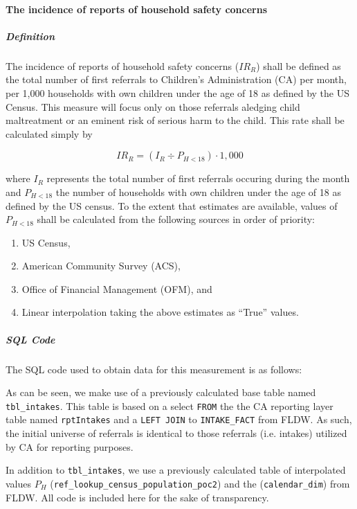 \documentclass[12pt]{article}\usepackage[]{graphicx}\usepackage[]{color}
\begin{document}
\paragraph{The incidence of reports of household safety concerns}

\subparagraph{Definition} The incidence of reports of household safety concerns ($IR_R$) shall be defined as the total number of first referrals to Children's Administration (CA) per month, per 1,000 households with own children under the age of 18 as defined by the US Census. This measure will focus only on those referrals aledging child maltreatment or an eminent risk of serious harm to the child. This rate shall be calculated simply by 

\begin{equation}\label{eq:IRR}
IR_R = (I_R \div P_{H<18}) \cdot 1,000
\end{equation}

where $I_R$ represents the total number of first referrals occuring during the month and $P_{H<18}$ the number of households with own children under the age of 18 as defined by the US census. To the extent that estimates are available, values of $P_{H<18}$ shall be calculated from the following sources in order of priority:

\begin{enumerate}
  \item US Census,
  \item American Community Survey (ACS), 
  \item Office of Financial Management (OFM), and 
  \item Linear interpolation taking the above estimates as ``True'' values. 
\end{enumerate}

\subparagraph{SQL Code}

The SQL code used to obtain data for this measurement is as follows: 



As can be seen, we make use of a previously calculated base table named \texttt{tbl\_intakes}. This table is based on a select \texttt{FROM} the the CA reporting layer table named \texttt{rptIntakes} and a \texttt{LEFT JOIN} to \texttt{INTAKE\_FACT} from FLDW. As such, the initial universe of referrals is identical to those referrals (i.e. intakes) utilized by CA for reporting purposes.  

In addition to \texttt{tbl\_intakes}, we use a previously calculated table of interpolated values $P_H$ (\texttt{ref\_lookup\_census\_population\_poc2}) and the (\texttt{calendar\_dim}) from FLDW. All code is included here for the sake of transparency. 
\end{document}
